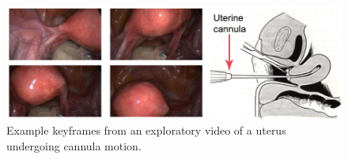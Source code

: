 

\begin{figure}[t]
  \centering
  \includegraphics[width=0.99\columnwidth]{./figs/exploratory.pdf}
  \caption{Example keyframes from an exploratory video of a uterus undergoing cannula motion.}
	\label{fig:cannula}
\end{figure}


